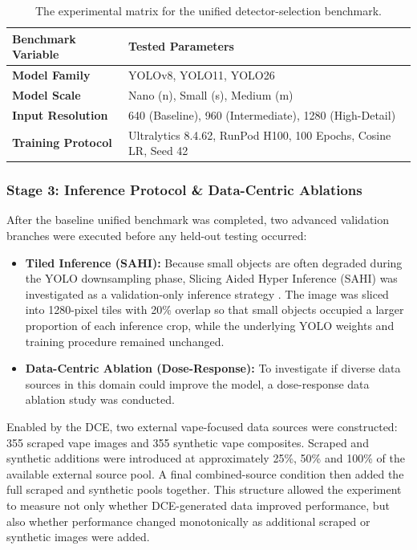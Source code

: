\begin{table}[H]
\centering
\small
\renewcommand{\arraystretch}{1.2}
\begin{tabularx}{\textwidth}{@{} p{} X @{}}
\toprule
\textbf{Benchmark Variable} & \textbf{Tested Parameters} \\
\midrule
\textbf{Model Family} & YOLOv8, YOLO11, YOLO26 \\
\textbf{Model Scale} & Nano (n), Small (s), Medium (m) \\
\textbf{Input Resolution} & 640 (Baseline), 960 (Intermediate), 1280 (High-Detail) \\
\textbf{Training Protocol} & Ultralytics 8.4.62, RunPod H100, 100 Epochs, Cosine LR, Seed 42 \\
\bottomrule
\end{tabularx}
\caption{The experimental matrix for the unified detector-selection benchmark.}
\label{tab:uavape_benchmark_matrix}
\end{table}

\subsubsection{Stage 3: Inference Protocol \& Data-Centric Ablations}
After the baseline unified benchmark was completed, two advanced validation branches were executed before any held-out testing occurred:

\begin{itemize}
    \item \textbf{Tiled Inference (SAHI):} Because small objects are often degraded during the YOLO downsampling phase, Slicing Aided Hyper Inference (SAHI) was investigated as a validation-only inference strategy \cite{akyon2022sahi}. The image was sliced into 1280-pixel tiles with 20\% overlap so that small objects occupied a larger proportion of each inference crop, while the underlying YOLO weights and training procedure remained unchanged.    
    \item \textbf{Data-Centric Ablation (Dose-Response):} To investigate if diverse data sources in this domain could improve the model, a dose-response data ablation study was conducted. 
\end{itemize}

Enabled by the DCE, two external vape-focused data sources were constructed: 355 scraped vape images and 355 synthetic vape composites. Scraped and synthetic additions were introduced at approximately 25\%, 50\% and 100\% of the available external source pool. A final combined-source condition then added the full scraped and synthetic pools together. This structure allowed the experiment to measure not only whether DCE-generated data improved performance, but also whether performance changed monotonically as additional scraped or synthetic images were added.

